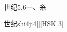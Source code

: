 \begin{entry}{世纪}{5,6}{⼀、⽷}
  \begin{phonetics}{世纪}{shi4ji4}[][HSK 3]
  \end{phonetics}
\end{entry}

